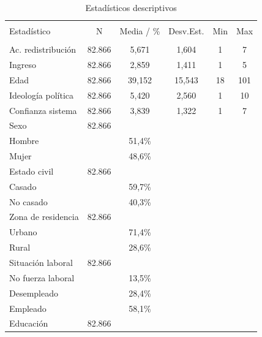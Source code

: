 \documentclass[12pt,letterpaper]{article}
\begin{document}
\begin{table}[t] \centering 
	\caption{Estadísticos descriptivos} 
	\label{tab1}
    \renewcommand{\arraystretch}{0.7}
	\begin{tabular}{@{\extracolsep{5pt}}lccccc} 
		\\[-1.8ex]\hline 
		\hline \\[-1.8ex] 
		Estadístico & \multicolumn{1}{c}{N} & \multicolumn{1}{c}{Media / \%} & \multicolumn{1}{c}{Desv.Est.} & \multicolumn{1}{c}{Min} & \multicolumn{1}{c}{Max} \\ 
		\hline \\[-1.8ex] 
		Ac. redistribución & 82.866 & 5,671 & 1,604 & 1 & 7 \\ 
		Ingreso & 82.866 & 2,859 & 1,411 & 1 & 5 \\ 
		Edad & 82.866 & 39,152 & 15,543 & 18 & 101 \\ 
		Ideología política & 82.866 & 5,420 & 2,560 & 1 & 10 \\ 
		Confianza sistema & 82.866 & 3,839 & 1,322 & 1 & 7 \\ 
		Sexo & 82.866 &  &  & &  \\ 
		\hspace{3mm}Hombre & & 51,4\% & & & \\
		\hspace{3mm}Mujer & & 48,6\% & & & \\
		Estado civil & 82.866 &  &  &  &  \\ 
		\hspace{3mm}Casado & & 59,7\% & & & \\
		\hspace{3mm}No casado & & 40,3\% & & & \\
		Zona de residencia & 82.866 &  &  &  &  \\ 
		\hspace{3mm}Urbano & & 71,4\% & & & \\
		\hspace{3mm}Rural & & 28,6\% & & & \\
		Situación laboral & 82.866 &  &  &  &  \\ 
		\hspace{3mm}No fuerza laboral & & 13,5\% & & & \\
		\hspace{3mm}Desempleado & & 28,4\% & & & \\
		\hspace{3mm}Empleado & & 58,1\% & & & \\
		Educación & 82.866 &  &  &  &  \\ 

\end{tabular}
\end{table}
\end{document}
